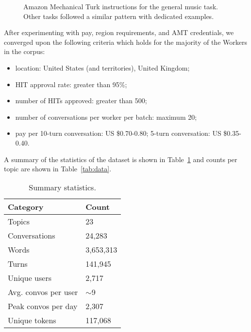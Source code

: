 \documentclass[11pt,a4paper]{article}
\begin{document}
\begin{figure}[htbp]

  \centering
  \caption{Amazon Mechanical Turk instructions for the general music task. Other tasks followed a similar pattern with dedicated examples.}
  \label{fig:mturk_interface_self}
\end{figure}

After experimenting with pay, region requirements, and AMT credentials, we converged upon the following criteria which holds for the majority of the Workers in the corpus:
\begin{itemize}
\itemsep0em
\item location: United States (and territories), United Kingdom;
\item HIT approval rate: greater than 95\%;
\item number of HITs approved: greater than 500;
\item number of conversations per worker per batch: maximum 20;
\item pay per 10-turn conversation: US \$0.70-0.80; 5-turn conversation: US \$0.35-0.40.
\end{itemize}

A summary of the statistics of the dataset is shown in Table~\ref{tab:stats} and counts per topic are shown in Table~\ref{tab:data}.

\begin{table}[h]
\begin{center}
  \begin{small}
  \begin{tabular}{|l|l|}
    \hline
    \bf Category & \bf Count \\
    \hline
    Topics & 23 \\
    Conversations & 24,283\\
    Words & 3,653,313 \\
    Turns & 141,945 \\
    Unique users & 2,717 \\
    Avg. convos per user & $\sim$9 \\
    Peak convos per day & 2,307\\
    Unique tokens & 117,068 \\
    \hline
  \end{tabular}
  \end{small}
  \smallskip
    \caption{Summary statistics.}
    \label{tab:stats}
\end{center}
\end{table}
\end{document}
